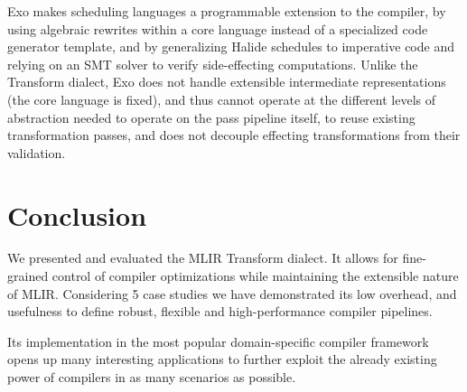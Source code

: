 \documentclass[screen,nonacm,authorversion]{acmart}
\begin{document}
Exo \cite{10.1145/3519939.3523446} makes scheduling languages a programmable extension to the compiler, by using algebraic rewrites within a core language instead of a specialized code generator template, and by generalizing Halide schedules to imperative code and relying on an SMT solver to verify side-effecting computations. Unlike the Transform dialect, Exo does not handle extensible intermediate representations (the core language is fixed), and thus cannot operate at the different levels of abstraction needed to operate on the pass pipeline itself, to reuse existing transformation passes, and does not decouple effecting transformations from their validation.

\section{Conclusion}
We presented and evaluated the MLIR Transform dialect.
It allows for fine-grained control of compiler optimizations while maintaining the extensible nature of MLIR.
Considering 5 case studies we have demonstrated its low overhead, and usefulness to define robust, flexible and high-performance compiler pipelines.

Its implementation in the most popular domain-specific compiler framework opens up many interesting applications to further exploit the already existing power of compilers in as many scenarios as possible.



\end{document}
